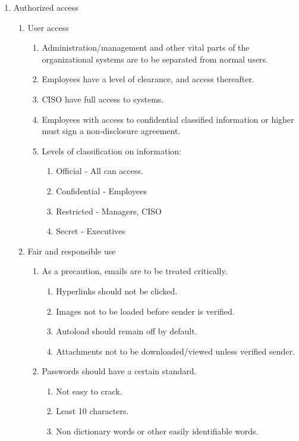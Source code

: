 \begin{enumerate}
\begin{enumerate}
\begin{enumerate}
    \end{enumerate}
  \end{enumerate}
  \item Authorized access
  \begin{enumerate}
    \item User access
    \begin{enumerate}
      \item Administration/management and other vital parts of the organizational systems are to be separated from normal users.
      \item Employees have a level of clearance, and access thereafter. 
      \item CISO have full access to systems.
      \item Employees with access to confidential classified information or higher must sign a non-disclosure agreement.
      \item Levels of classification on information:
      \begin{enumerate}
        \item Official - All can access.
        \item Confidential - Employees
        \item Restricted - Managers, CISO
        \item Secret - Executives
      \end{enumerate}
    \end{enumerate}
    \item Fair and responsible use
    \begin{enumerate}
      \item As a precaution, emails are to be treated critically.
      \begin{enumerate}
        \item Hyperlinks should not be clicked.
        \item Images not to be loaded before sender is verified.
        \item Autoload should remain off by default.
        \item Attachments not to be downloaded/viewed unless verified sender.
      \end{enumerate}
      \item Passwords should have a certain standard.
      \begin{enumerate}
        \item Not easy to crack.
        \item Least 10 characters.
        \item Non dictionary words or other easily identifiable words.

\end{enumerate}
\end{enumerate}
\end{enumerate}
\end{enumerate}
